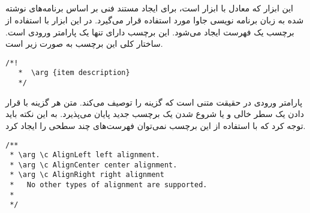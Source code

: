 \subsection{}

این ابزار که معادل با ابزار  است، برای ایجاد مستند فنی بر اساس
برنامه‌های نوشته شده به زبان برنامه نویسی جاوا مورد استفاده قرار می‌گیرد. در این
ابزار با استفاده از برچسب  یک فهرست ایجاد می‌شود. این برچسب دارای تنها
یک پارامتر ورودی است. ساختار کلی این برچسب به صورت زیر است.

\begin{latin}
\lstset{language=C++}  
\begin{lstlisting}[frame=single] 
  /*! 
   *  \arg {item description}
   */
\end{lstlisting}
\end{latin}

پارامتر ورودی در حقیقت متنی است که گزینه را توصیف می‌کند. متن هر گزینه با قرار
دادن یک سطر خالی و یا شروع شدن یک برچسب جدید   پایان می‌پذیرد. به این
نکته باید توجه کرد که با استفاده از این برچسب نمی‌توان فهرست‌های چند سطحی را
ایجاد کرد.

\begin{latin}
 \lstset{language=C++}  
\begin{lstlisting}[frame=single] 
/**
 * \arg \c AlignLeft left alignment.
 * \arg \c AlignCenter center alignment.
 * \arg \c AlignRight right alignment
 *	 No other types of alignment are supported.
 * 
 */
\end{lstlisting}
\end{latin}
